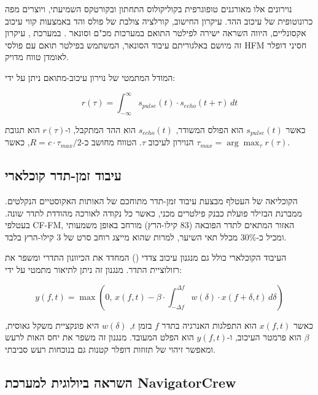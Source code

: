 נוירונים אלו מאורגנים טופוגרפית בקוליקולוס התחתון ובקורטקס השמיעתי, ויוצרים מפה כרונוטופית של עיכוב ההד. עיקרון החישוב, קורלציה צולבת של פולס והד באמצעות קווי עיכוב אקסונליים, היווה השראה ישירה לפילטר התואם במערכות מכ"ם וסונאר \cite{Rihaczek1969MatchedFilter}. במערכת , עיקרון זה מיושם באלגוריתם עיבוד הסונאר, המשתמש בפילטר תואם עם פולסי HFM חסיני דופלר לאומדן טווח מדויק.

המודל המתמטי של נוירון עיכוב-מתואם ניתן על ידי:

\begin{equation}
r(\tau) = \int_{-\infty}^{\infty} s_{pulse}(t) \cdot s_{echo}(t + \tau) \, dt
\label{eq:ch02_delay_tuned}
\end{equation}

כאשר $s_{pulse}(t)$ הוא הפולס המשודר, $s_{echo}(t)$ הוא ההד המתקבל, ו-$r(\tau)$ הוא תגובת הנוירון לעיכוב $\tau$. הטווח מחושב כ-$R = c \cdot \tau_{max} / 2$, כאשר $\tau_{max} = \arg\max_\tau r(\tau)$.

\subsection{עיבוד זמן-תדר קוכלארי}
\label{sec:ch02_cochlear_processing}

הקוכליאה של העטלף מבצעת עיבוד זמן-תדר מתוחכם של האותות האקוסטיים הנקלטים. ממברנת הבזילר פועלת כבנק פילטרים מכני, כאשר כל נקודה לאורכה מהודדת לתדר שונה. בעטלפי CF-FM, האזור המתאים לתדר הפובאה (83 קילו-הרץ) מורחב באופן משמעותי ומכיל כ-30\% מכלל תאי השיער, למרות שהוא מייצג רוחב סרט של 3 קילו-הרץ בלבד.

העיבוד הקוכלארי כולל גם מנגנון עיכוב צדדי () המחדד את הכיוונון התדרי ומשפר את רזולוציית התדר. מנגנון זה ניתן לתיאור מתמטי על ידי:

\begin{equation}
y(f, t) = \max\left(0, \, x(f, t) - \beta \cdot \int_{-\Delta f}^{\Delta f} w(\delta) \cdot x(f + \delta, t) \, d\delta\right)
\label{eq:ch02_lateral_inhibition}
\end{equation}

כאשר $x(f, t)$ הוא התפלגות האנרגיה בתדר $f$ בזמן $t$, $w(\delta)$ היא פונקציית משקל גאוסית, $\beta$ הוא פרמטר העיכוב, ו-$y(f, t)$ הוא הפלט המעובד. מנגנון זה משפר את יחס האות לרעש ומאפשר זיהוי של תזוזות דופלר קטנות גם בנוכחות רעש סביבתי.

\subsection{השראה ביולוגית למערכת NavigatorCrew}
\label{sec:ch02_bio_inspiration}

